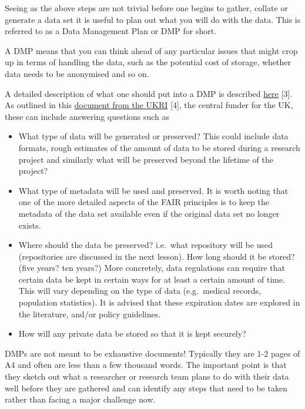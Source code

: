 \documentclass[
  letterpaper,
  DIV=11,
  numbers=noendperiod]{scrreport}
\begin{document}
Seeing as the above steps are not trivial before one begins to gather,
collate or generate a data set it is useful to plan out what you will do
with the data. This is referred to as a Data Management Plan or DMP for
short.

A DMP means that you can think ahead of any particular issues that might
crop up in terms of handling the data, such as the potential cost of
storage, whether data needs to be anonymised and so on.

A detailed description of what one should put into a DMP is described
\href{https://the-turing-way.netlify.app/reproducible-research/rdm/rdm-dmp.html}{here}
{[}3{]}. As outlined in this
\href{https://www.ukri.org/councils/stfc/guidance-for-applicants/what-to-include-in-your-proposal/data-management-plan/}{document
from the UKRI} {[}4{]}, the central funder for the UK, these can include
answering questions such as

\begin{itemize}
\item
  What type of data will be generated or preserved? This could include
  data formats, rough estimates of the amount of data to be stored
  during a research project and similarly what will be preserved beyond
  the lifetime of the project?
\item
  What type of metadata will be used and preserved. It is worth noting
  that one of the more detailed aspects of the FAIR principles is to
  keep the metadata of the data set available even if the original data
  set no longer exists.
\item
  Where should the data be preserved? i.e.~what repository will be used
  (repositories are discussed in the next lesson). How long should it be
  stored? (five years? ten years?) More concretely, data regulations can
  require that certain data be kept in certain ways for at least a
  certain amount of time. This will vary depending on the type of data
  (e.g.~medical records, population statistics). It is advised that
  these expiration dates are explored in the literature, and/or policy
  guidelines.\\
\item
  How will any private data be stored so that it is kept securely?
\end{itemize}

DMPs are not meant to be exhaustive documents! Typically they are 1-2
pages of A4 and often are less than a few thousand words. The important
point is that they sketch out what a researcher or research team plans
to do with their data well before they are gathered and can identify any
steps that need to be taken rather than facing a major challenge now.
\end{document}
